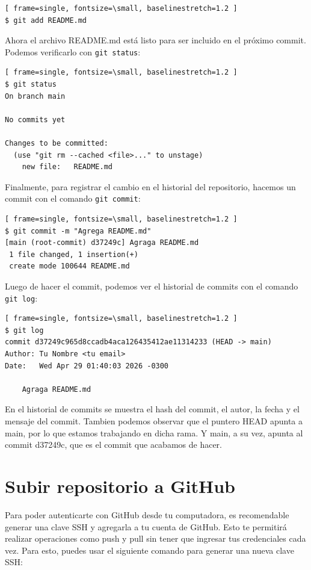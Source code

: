 \documentclass{apuntes_itsv}
\begin{document}
\begin{Verbatim}[ frame=single, fontsize=\small, baselinestretch=1.2 ]
$ git add README.md
\end{Verbatim}

Ahora el archivo README.md está listo para ser incluido en el próximo commit. Podemos verificarlo con \texttt{git status}:

\begin{Verbatim}[ frame=single, fontsize=\small, baselinestretch=1.2 ]
$ git status
On branch main

No commits yet

Changes to be committed:
  (use "git rm --cached <file>..." to unstage)
	new file:   README.md
\end{Verbatim}

Finalmente, para registrar el cambio en el historial del repositorio, hacemos un commit con el comando \texttt{git commit}:
\begin{Verbatim}[ frame=single, fontsize=\small, baselinestretch=1.2 ]
$ git commit -m "Agrega README.md"
[main (root-commit) d37249c] Agraga README.md
 1 file changed, 1 insertion(+)
 create mode 100644 README.md
\end{Verbatim}

Luego de hacer el commit, podemos ver el historial de commits con el comando \texttt{git log}:
\begin{Verbatim}[ frame=single, fontsize=\small, baselinestretch=1.2 ]
$ git log
commit d37249c965d8ccadb4aca126435412ae11314233 (HEAD -> main)
Author: Tu Nombre <tu email>
Date:   Wed Apr 29 01:40:03 2026 -0300

    Agraga README.md

\end{Verbatim}

En el historial de commits se muestra el hash del commit, el autor, la fecha y el mensaje del commit.
Tambien podemos observar que el puntero HEAD apunta a main, por lo que estamos trabajando en dicha rama.
Y main, a su vez, apunta al commit d37249c, que es el commit que acabamos de hacer.

\section{Subir repositorio a GitHub}
Para poder autenticarte con GitHub desde tu computadora, es recomendable generar una clave SSH y agregarla a tu cuenta
de GitHub. Esto te permitirá realizar operaciones como push y pull sin tener que ingresar tus credenciales cada vez.
Para esto, puedes usar el siguiente comando para generar una nueva clave SSH:
\end{document}
